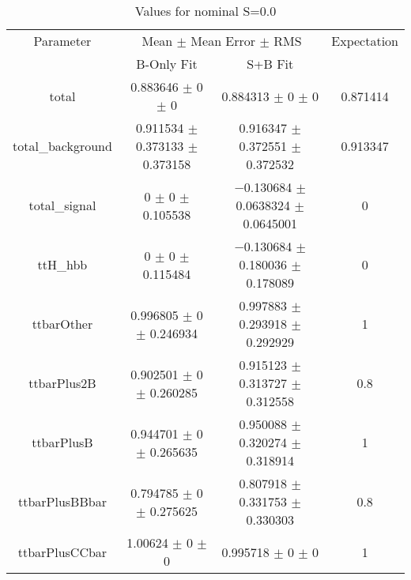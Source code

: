 \begin{table}
\centering
\caption{Values for nominal S=0.0}
\begin{tabular}{cccc}
\toprule
Parameter & \multicolumn{2}{c}{Mean $\pm$ Mean Error $\pm$ RMS} & Expectation\\
 & B-Only Fit & S+B Fit & \\
\midrule
total & \num{0.883646} $\pm$ \num{0} $\pm$ \num{0} & \num{0.884313} $\pm$ \num{0} $\pm$ \num{0} & \num{0.871414}\\
total\_background & \num{0.911534} $\pm$ \num{0.373133} $\pm$ \num{0.373158} & \num{0.916347} $\pm$ \num{0.372551} $\pm$ \num{0.372532} & \num{0.913347}\\
total\_signal & \num{0} $\pm$ \num{0} $\pm$ \num{0.105538} & \num{-0.130684} $\pm$ \num{0.0638324} $\pm$ \num{0.0645001} & \num{0}\\
ttH\_hbb & \num{0} $\pm$ \num{0} $\pm$ \num{0.115484} & \num{-0.130684} $\pm$ \num{0.180036} $\pm$ \num{0.178089} & \num{0}\\
ttbarOther & \num{0.996805} $\pm$ \num{0} $\pm$ \num{0.246934} & \num{0.997883} $\pm$ \num{0.293918} $\pm$ \num{0.292929} & \num{1}\\
ttbarPlus2B & \num{0.902501} $\pm$ \num{0} $\pm$ \num{0.260285} & \num{0.915123} $\pm$ \num{0.313727} $\pm$ \num{0.312558} & \num{0.8}\\
ttbarPlusB & \num{0.944701} $\pm$ \num{0} $\pm$ \num{0.265635} & \num{0.950088} $\pm$ \num{0.320274} $\pm$ \num{0.318914} & \num{1}\\
ttbarPlusBBbar & \num{0.794785} $\pm$ \num{0} $\pm$ \num{0.275625} & \num{0.807918} $\pm$ \num{0.331753} $\pm$ \num{0.330303} & \num{0.8}\\
ttbarPlusCCbar & \num{1.00624} $\pm$ \num{0} $\pm$ \num{0} & \num{0.995718} $\pm$ \num{0} $\pm$ \num{0} & \num{1}\\
\bottomrule
\end{tabular}
\end{table}